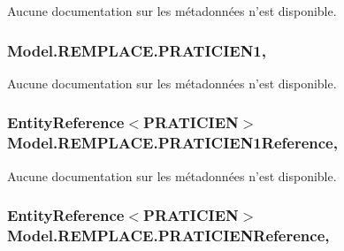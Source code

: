 Aucune documentation sur les métadonnées n'est disponible. 

\hypertarget{class_model_1_1_r_e_m_p_l_a_c_e_a4a071b1a7be7992a57e0f67876808145}{
\subsubsection[{P\-R\-A\-T\-I\-C\-I\-E\-N1}]{ Model.\-R\-E\-M\-P\-L\-A\-C\-E.\-P\-R\-A\-T\-I\-C\-I\-E\-N1\hspace{0.3cm}{\ttfamily [get]}, {\ttfamily [set]}}}\label{class_model_1_1_r_e_m_p_l_a_c_e_a4a071b1a7be7992a57e0f67876808145}


Aucune documentation sur les métadonnées n'est disponible. 

\hypertarget{class_model_1_1_r_e_m_p_l_a_c_e_a57e1924ffc9f114166ef3cd638f600af}{
\subsubsection[{P\-R\-A\-T\-I\-C\-I\-E\-N1\-Reference}]{\setlength{\rightskip}{0pt plus 5cm}Entity\-Reference$<${\bf P\-R\-A\-T\-I\-C\-I\-E\-N}$>$ Model.\-R\-E\-M\-P\-L\-A\-C\-E.\-P\-R\-A\-T\-I\-C\-I\-E\-N1\-Reference\hspace{0.3cm}{\ttfamily [get]}, {\ttfamily [set]}}}\label{class_model_1_1_r_e_m_p_l_a_c_e_a57e1924ffc9f114166ef3cd638f600af}


Aucune documentation sur les métadonnées n'est disponible. 

\hypertarget{class_model_1_1_r_e_m_p_l_a_c_e_ae00edbfe75242bb1d02e1315c5cdacd8}{
\subsubsection[{P\-R\-A\-T\-I\-C\-I\-E\-N\-Reference}]{\setlength{\rightskip}{0pt plus 5cm}Entity\-Reference$<${\bf P\-R\-A\-T\-I\-C\-I\-E\-N}$>$ Model.\-R\-E\-M\-P\-L\-A\-C\-E.\-P\-R\-A\-T\-I\-C\-I\-E\-N\-Reference\hspace{0.3cm}{\ttfamily [get]}, {\ttfamily [set]}}}\label{class_model_1_1_r_e_m_p_l_a_c_e_ae00edbfe75242bb1d02e1315c5cdacd8}


